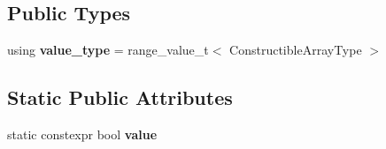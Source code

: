 \subsection*{Public Types}
\begin{DoxyCompactItemize}
\item 
\mbox{\label{structnlohmann_1_1detail_1_1is__constructible__array__type__impl_3_01BasicJsonType_00_01Construc9fb32d79d2f03f291695c23371cb431d_a438d22266bdc2c931702813be54fe166}} 
using {\bfseries value\+\_\+type} = range\+\_\+value\+\_\+t$<$ Constructible\+Array\+Type $>$
\end{DoxyCompactItemize}
\subsection*{Static Public Attributes}
\begin{DoxyCompactItemize}
\item 
static constexpr bool {\bfseries value}
\end{DoxyCompactItemize}


